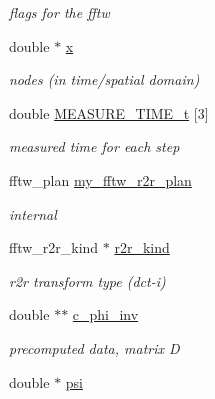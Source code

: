 \begin{CompactItemize}
\begin{CompactList}\small\item\em flags for the fftw \item\end{CompactList}\item 
\hypertarget{structnfst__plan_048ebad4f2abe3821988fa06a5e308d8}{
double $\ast$ \hyperlink{structnfst__plan_048ebad4f2abe3821988fa06a5e308d8}{x}}
\label{structnfst__plan_048ebad4f2abe3821988fa06a5e308d8}

\begin{CompactList}\small\item\em nodes (in time/spatial domain) \item\end{CompactList}\item 
\hypertarget{structnfst__plan_74e5be807909e0a443ea9b48e0a7da4b}{
double \hyperlink{structnfst__plan_74e5be807909e0a443ea9b48e0a7da4b}{MEASURE\_\-TIME\_\-t} \mbox{[}3\mbox{]}}
\label{structnfst__plan_74e5be807909e0a443ea9b48e0a7da4b}

\begin{CompactList}\small\item\em measured time for each step \item\end{CompactList}\item 
fftw\_\-plan \hyperlink{structnfst__plan_f14a8654877825238cc8a6f39d425d7b}{my\_\-fftw\_\-r2r\_\-plan}
\begin{CompactList}\small\item\em internal \item\end{CompactList}\item 
\hypertarget{structnfst__plan_3600a9bb43b2b3fee62e2040c21448ab}{
fftw\_\-r2r\_\-kind $\ast$ \hyperlink{structnfst__plan_3600a9bb43b2b3fee62e2040c21448ab}{r2r\_\-kind}}
\label{structnfst__plan_3600a9bb43b2b3fee62e2040c21448ab}

\begin{CompactList}\small\item\em r2r transform type (dct-i) \item\end{CompactList}\item 
\hypertarget{structnfst__plan_2c42ae2c8ca95bb4c0c1dfc279bc2cab}{
double $\ast$$\ast$ \hyperlink{structnfst__plan_2c42ae2c8ca95bb4c0c1dfc279bc2cab}{c\_\-phi\_\-inv}}
\label{structnfst__plan_2c42ae2c8ca95bb4c0c1dfc279bc2cab}

\begin{CompactList}\small\item\em precomputed data, matrix D \item\end{CompactList}\item 
\hypertarget{structnfst__plan_59c1ef7493650838cf31086a46ff2e3f}{
double $\ast$ \hyperlink{structnfst__plan_59c1ef7493650838cf31086a46ff2e3f}{psi}}
\label{structnfst__plan_59c1ef7493650838cf31086a46ff2e3f}


\end{CompactItemize}
